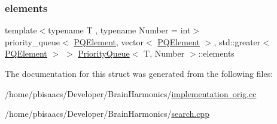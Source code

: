 \subsubsection{\texorpdfstring{elements}{elements}}
{\footnotesize\ttfamily template$<$typename T , typename Number  = int$>$ \\
priority\+\_\+queue$<$ \mbox{\hyperlink{structPriorityQueue_ae86a19aae3f9a32a1d76dfdab34eb70b}{P\+Q\+Element}}, vector$<$ \mbox{\hyperlink{structPriorityQueue_ae86a19aae3f9a32a1d76dfdab34eb70b}{P\+Q\+Element}} $>$, std\+::greater$<$ \mbox{\hyperlink{structPriorityQueue_ae86a19aae3f9a32a1d76dfdab34eb70b}{P\+Q\+Element}} $>$ $>$ \mbox{\hyperlink{structPriorityQueue}{Priority\+Queue}}$<$ T, Number $>$\+::elements}



The documentation for this struct was generated from the following files\+:\begin{DoxyCompactItemize}
\item 
/home/pbisaacs/\+Developer/\+Brain\+Harmonics/\mbox{\hyperlink{implementation_01orig_8cc}{implementation orig.\+cc}}\item 
/home/pbisaacs/\+Developer/\+Brain\+Harmonics/\mbox{\hyperlink{search_8cpp}{search.\+cpp}}\end{DoxyCompactItemize}
